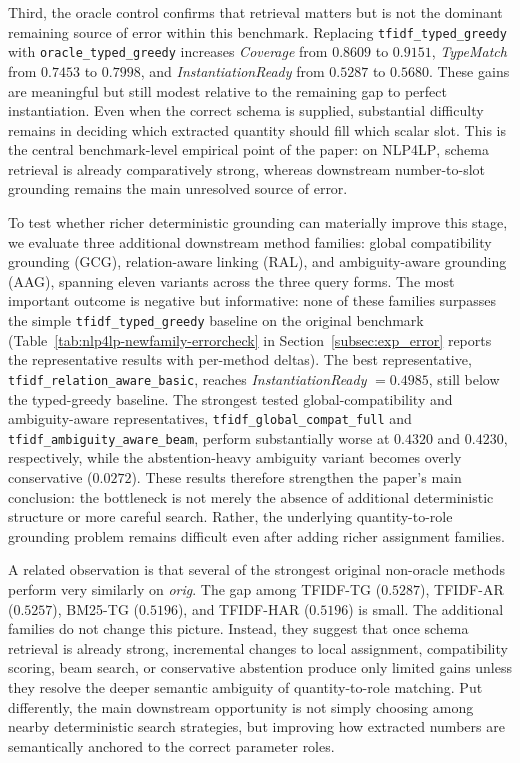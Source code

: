 \documentclass[pdflatex,sn-basic,Numbered]{sn-jnl}
\begin{document}
Third, the oracle control confirms that retrieval matters but is not the dominant remaining source of error within this benchmark. Replacing \texttt{tfidf\_typed\_greedy} with \texttt{oracle\_typed\_greedy} increases \textit{Coverage} from $0.8609$ to $0.9151$, \textit{TypeMatch} from $0.7453$ to $0.7998$, and \textit{InstantiationReady} from $0.5287$ to $0.5680$. These gains are meaningful but still modest relative to the remaining gap to perfect instantiation. Even when the correct schema is supplied, substantial difficulty remains in deciding which extracted quantity should fill which scalar slot. This is the central benchmark-level empirical point of the paper: on \textsc{NLP4LP}, schema retrieval is already comparatively strong, whereas downstream number-to-slot grounding remains the main unresolved source of error.

To test whether richer deterministic grounding can materially improve this stage, we evaluate three additional downstream method families: global compatibility grounding (GCG), relation-aware linking (RAL), and ambiguity-aware grounding (AAG), spanning eleven variants across the three query forms. The most important outcome is negative but informative: none of these families surpasses the simple \texttt{tfidf\_typed\_greedy} baseline on the original benchmark (Table~\ref{tab:nlp4lp-newfamily-errorcheck} in Section~\ref{subsec:exp_error} reports the representative results with per-method deltas). The best representative, \texttt{tfidf\_relation\_aware\_basic}, reaches \textit{InstantiationReady} $=0.4985$, still below the typed-greedy baseline. The strongest tested global-compatibility and ambiguity-aware representatives, \texttt{tfidf\_global\_compat\_full} and \texttt{tfidf\_ambiguity\_aware\_beam}, perform substantially worse at $0.4320$ and $0.4230$, respectively, while the abstention-heavy ambiguity variant becomes overly conservative ($0.0272$). These results therefore strengthen the paper's main conclusion: the bottleneck is not merely the absence of additional deterministic structure or more careful search. Rather, the underlying quantity-to-role grounding problem remains difficult even after adding richer assignment families.

A related observation is that several of the strongest original non-oracle methods perform very similarly on \emph{orig}. The gap among TFIDF-TG ($0.5287$), TFIDF-AR ($0.5257$), BM25-TG ($0.5196$), and TFIDF-HAR ($0.5196$) is small. The additional families do not change this picture. Instead, they suggest that once schema retrieval is already strong, incremental changes to local assignment, compatibility scoring, beam search, or conservative abstention produce only limited gains unless they resolve the deeper semantic ambiguity of quantity-to-role matching. Put differently, the main downstream opportunity is not simply choosing among nearby deterministic search strategies, but improving how extracted numbers are semantically anchored to the correct parameter roles.
\end{document}
